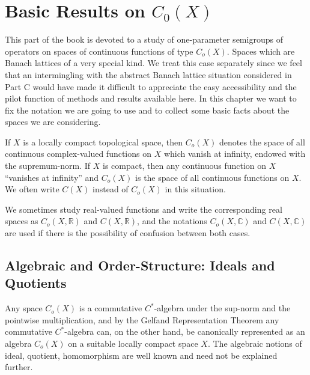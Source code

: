 
\chapter{Basic Results on $C_{0}(X)$}\label{chap:B-I}


This part of the book is devoted to a study of one-parameter semigroups of operators on spaces of continuous functions of type $C_{o}(X)$.
Spaces which are Banach lattices of a very special kind.
We treat this case separately since we feel that an intermingling with the abstract Banach lattice situation considered in Part C would have made it difficult to appreciate the easy accessibility and the pilot function of methods and results available here.
In this chapter we want to fix the notation we are going to use and to collect some basic facts about the spaces we are considering.

If $X$ is a locally compact topological space, then $C_{o}(X)$ denotes the space of all continuous complex-valued functions on $X$ which vanish at infinity, endowed with the supremum-norm.
If $X$ is compact, then any continuous function on $X$ \enquote{vanishes at infinity} and $C_{o}(X)$ is the space of all continuous functions on $X$.
We often write $C(X)$ instead of $C_{o}(X)$ in this situation.

We sometimes study real-valued functions and write the corresponding real spaces as $C_{o}(X,\mathbb{R})$ and $C(X,\mathbb{R})$, and the notations $C_{o}(X,\mathbb{C})$ and $C(X,\mathbb{C})$ are used if there is the possibility of confusion between both cases.

\section{Algebraic and Order-Structure: Ideals and Quotients}\label{sec:b1-1}

Any space $C_{o}(X)$ is a commutative $C^{*}$-algebra under the sup-norm and the pointwise multiplication, and by the Gelfand Representation Theorem any commutative $C^{*}$-algebra can, on the other hand, be canonically represented as an algebra $C_{o}(X)$ on a suitable locally compact space $X$.
The algebraic notions of ideal, quotient, homomorphism are
well known and need not be explained further.




